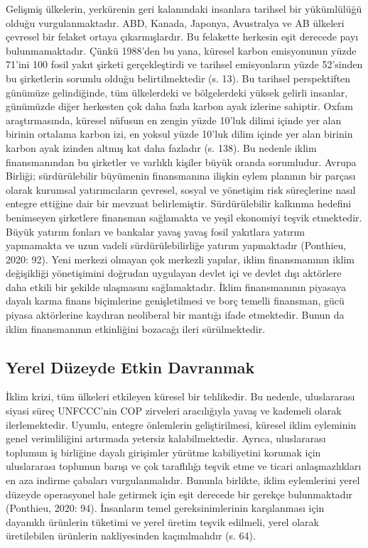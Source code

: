 \documentclass[
]{book}
\begin{document}
Gelişmiş ülkelerin, yerkürenin geri kalanındaki insanlara tarihsel bir yükümlülüğü olduğu vurgulanmaktadır. ABD, Kanada, Japonya, Avustralya ve AB ülkeleri çevresel bir felaket ortaya çıkarmışlardır. Bu felakette herkesin eşit derecede payı bulunmamaktadır. Çünkü 1988'den bu yana, küresel karbon emisyonunun yüzde 71'ini 100 fosil yakıt şirketi gerçekleştirdi ve tarihsel emisyonların yüzde 52'sinden bu şirketlerin sorumlu olduğu belirtilmektedir (s. 13). \citep{empson2020iklimi} Bu tarihsel perspektiften günümüze gelindiğinde, tüm ülkelerdeki ve bölgelerdeki yüksek gelirli insanlar, günümüzde diğer herkesten çok daha fazla karbon ayak izlerine sahiptir. Oxfam araştırmasında, küresel nüfusun en zengin yüzde 10'luk dilimi içinde yer alan birinin ortalama karbon izi, en yoksul yüzde 10'luk dilim içinde yer alan birinin karbon ayak izinden altmış kat daha fazladır (s. 138). \citep{chomsky2020} Bu nedenle iklim finansmanından bu şirketler ve varlıklı kişiler büyük oranda sorumludur.
Avrupa Birliği; sürdürülebilir büyümenin finansmanına ilişkin eylem planının bir parçası olarak kurumsal yatırımcıların çevresel, sosyal ve yönetişim risk süreçlerine nasıl entegre ettiğine dair bir mevzuat belirlemiştir. Sürdürülebilir kalkınma hedefini benimseyen şirketlere finansman sağlamakta ve yeşil ekonomiyi teşvik etmektedir. Büyük yatırım fonları ve bankalar yavaş yavaş fosil yakıtlara yatırım yapmamakta ve uzun vadeli sürdürülebilirliğe yatırım yapmaktadır (Ponthieu, 2020: 92). Yeni merkezi olmayan çok merkezli yapılar, iklim finansmanının iklim değişikliği yönetişimini doğrudan uygulayan devlet içi ve devlet dışı aktörlere daha etkili bir şekilde ulaşmasını sağlamaktadır. İklim finansmanının piyasaya dayalı karma finans biçimlerine genişletilmesi ve borç temelli finansman, gücü piyasa aktörlerine kaydıran neoliberal bir mantığı ifade etmektedir. Bunun da iklim finansmanının etkinliğini bozacağı ileri sürülmektedir. \citep{bracking2021climate}

\hypertarget{yerel-duxfczeyde-etkin-davranmak}{%
\subsection{Yerel Düzeyde Etkin Davranmak}\label{yerel-duxfczeyde-etkin-davranmak}}

İklim krizi, tüm ülkeleri etkileyen küresel bir tehlikedir. Bu nedenle, uluslararası siyasi süreç UNFCCC'nin COP zirveleri aracılığıyla yavaş ve kademeli olarak ilerlemektedir. Uyumlu, entegre önlemlerin geliştirilmesi, küresel iklim eyleminin genel verimliliğini artırmada yetersiz kalabilmektedir. Ayrıca, uluslararası toplumun iş birliğine dayalı girişimler yürütme kabiliyetini korumak için uluslararası toplumun barışı ve çok taraflılığı teşvik etme ve ticari anlaşmazlıkları en aza indirme çabaları vurgulanmalıdır. Bununla birlikte, iklim eylemlerini yerel düzeyde operasyonel hale getirmek için eşit derecede bir gerekçe bulunmaktadır (Ponthieu, 2020: 94). İnsanların temel gereksinimlerinin karşılanması için dayanıklı ürünlerin tüketimi ve yerel üretim teşvik edilmeli, yerel olarak üretilebilen ürünlerin nakliyesinden kaçınılmalıdır (s. 64). \citep{eden2015iklim}
\end{document}
